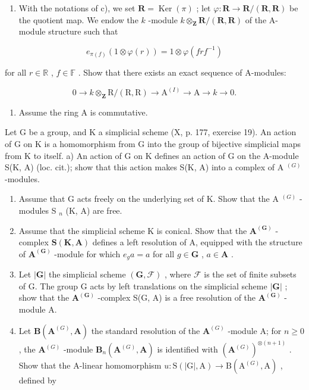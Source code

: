 \begin{enumerate}
\def\labelenumi{\alph{enumi})}
\setcounter{enumi}{3}
\tightlist
\item
  With the notations of c), we set \(\mathbf{R} = \operatorname{Ker}(\pi)\) ; let \(\varphi: \mathbf{R} \to \mathbf{R}/(\mathbf{R}, \mathbf{R})\) be the quotient map. We endow the \(k\) -module \(k \otimes_{\mathbf{Z}} \mathbf{R}/(\mathbf{R}, \mathbf{R})\) of the A-module structure such that
\end{enumerate}

\[
e _ {\pi (f)} \left(1 \otimes \varphi (r)\right) = 1 \otimes \varphi (f r f ^ {- 1})
\]

for all \(r \in \mathbb{R}\) , \(f \in \mathbb{F}\) . Show that there exists an exact sequence of A-modules:

\[
0 \rightarrow k \otimes_ {\mathbf {Z}} \mathrm{R} / (\mathrm{R}, \mathrm{R}) \rightarrow \mathrm{A} ^ {(I)} \rightarrow \mathrm{A} \rightarrow k \rightarrow 0.
\]

\begin{enumerate}
\def\labelenumi{\arabic{enumi})}
\setcounter{enumi}{3}
\tightlist
\item
  Assume the ring A is commutative.
\end{enumerate}

Let G be a group, and K a simplicial scheme (X, p. 177, exercise 19). An action of G on K is a homomorphism from G into the group of bijective simplicial maps from K to itself. a) An action of G on K defines an action of G on the A-module S(K, A) (loc. cit.); show that this action makes S(K, A) into a complex of A \(^{(G)}\) -modules.

\begin{enumerate}
\def\labelenumi{\alph{enumi})}
\setcounter{enumi}{1}
\item
  Assume that G acts freely on the underlying set of K. Show that the A \(^{(G)}\) -modules S \(_{n}\) (K, A) are free.
\item
  Assume that the simplicial scheme K is conical. Show that the \(\mathbf{A}^{(\mathbf{G})}\) -complex \(\mathbf{S}(\mathbf{K},\mathbf{A})\) defines a left resolution of A, equipped with the structure of \(\mathbf{A}^{(\mathbf{G})}\) -module for which \(e_g a = a\) for all \(g \in \mathbf{G}\) , \(a \in \mathbf{A}\) .
\item
  Let \(|\mathbf{G}|\) the simplicial scheme \((\mathbf{G},\mathcal{F})\) , where \(\mathcal{F}\) is the set of finite subsets of G. The group G acts by left translations on the simplicial scheme \(|\mathbf{G}|\) ; show that the \(\mathbf{A}^{(\mathbf{G})}\) -complex S(\textbar G\textbar, A) is a free resolution of the \(\mathbf{A}^{(\mathbf{G})}\) -module A.
\item
  Let \(\mathbf{B}(\mathbf{A}^{(G)},\mathbf{A})\) the standard resolution of the \(\mathbf{A}^{(G)}\) -module A; for \(n\geqslant 0\) , the \(\mathbf{A}^{(G)}\) -module \(\mathbf{B}_n(\mathbf{A}^{(G)},\mathbf{A})\) is identified with \((\mathbf{A}^{(G)})^{\otimes (n + 1)}\) . Show that the A-linear homomorphism \(u:\mathrm{S}(|\mathrm{G}|,\mathrm{A})\to \mathrm{B}(\mathrm{A}^{(G)},\mathrm{A})\) , defined by
\end{enumerate}

